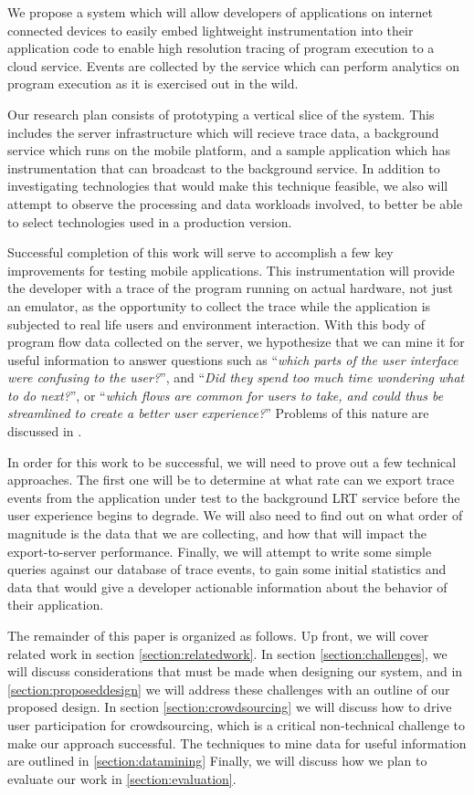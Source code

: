 \documentclass{acm_proc_article-sp}
\begin{document}
We propose a system which will allow developers of applications on internet connected 
devices to easily embed lightweight instrumentation 
into their application code to enable high resolution 
tracing of program execution to a cloud service. Events are collected by 
the service which can perform analytics on program execution as it is 
exercised out in the wild.

Our research plan consists of prototyping a vertical slice of the system.
This includes the server infrastructure which will recieve trace data,
a background service which runs on the mobile platform, and a sample
application which has instrumentation that can broadcast to the background service.
In addition to investigating technologies that would make this technique 
feasible, we also will attempt to observe the processing and data workloads
involved, to better be able to select technologies used in a production version.

Successful completion of this work will serve to accomplish a few key 
improvements for testing mobile applications. This instrumentation will provide 
the developer with a trace of the program running on actual hardware, not just 
an emulator, as the opportunity to collect the trace while the application is 
subjected to real life users and environment interaction. With this 
body of program flow data collected on the server, we hypothesize that we can mine it for useful 
information to answer questions such as ``\emph{which parts of the user interface were 
confusing to the user?}'', and ``\emph{Did they spend too much time wondering what to do 
next?}'', or ``\emph{which flows are common for users to take, and could thus be 
streamlined to create a better user experience?}'' Problems of this nature are 
discussed in \cite{WebAntiPattern}.

In order for this work to be successful, we will need to 
prove out a few technical approaches. The first one will be to determine at what rate can we
export trace events from the application under test to the background LRT service 
before the user experience begins to degrade. 
We will also need to find out on what order of magnitude is the data
that we are collecting, and how that will impact the export-to-server performance.
Finally, we will attempt to write some simple queries against our database of
trace events, to gain some initial statistics and data that would give a developer
actionable information about the behavior of their application.

The remainder of this paper is organized as follows. Up front, we will cover 
related work in section \ref{section:relatedwork}. In section \ref{section:challenges},
we will discuss considerations that must be made when designing our system, and in 
\ref{section:proposeddesign} we will address these challenges with an outline of
our proposed design. In section \ref{section:crowdsourcing} we will discuss how to drive
user participation for crowdsourcing, which is a critical non-technical 
challenge to make our approach successful. The techniques to mine data for useful 
information are outlined in \ref{section:datamining}
Finally, we will discuss how we plan to evaluate our work in \ref{section:evaluation}.
\end{document}
